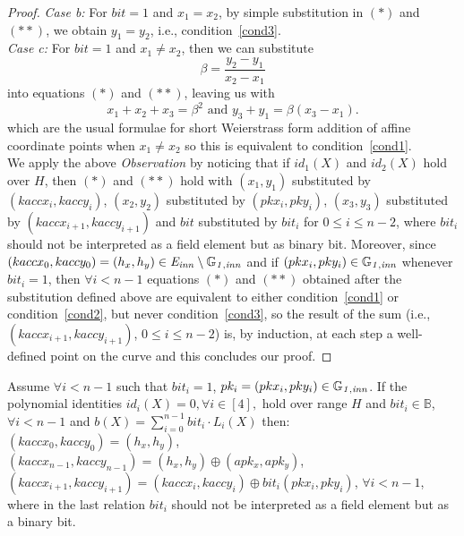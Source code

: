 \begin{proof}
\noindent \textit{Case b:} For $\mathit{bit}=1$ and $x_1=x_2$, by simple substitution in $(\ast)$ and $(\ast \ast)$, 
we obtain $y_1 = y_2$, i.e., condition~\ref{cond3}.  \\

\noindent \textit{Case c:} For $\mathit{bit}=1$ and $x_1 \neq x_2$, then we can substitute
$$\beta=\frac{y_2-y_1}{x_2-x_1}$$ into equations $(\ast)$ and $(\ast \ast)$, leaving us with
$$x_1+x_2+x_3=\beta^2 \textrm{ and } y_3+y_1=\beta(x_3-x_1).$$
which are the usual formulae for short Weierstrass form addition of affine coordinate points when $x_1 \neq x_2$ 
so this is equivalent to condition~\ref{cond1}. \\

\noindent We apply the above \textit{Observation} by noticing that if $id_1(X)$ and $id_2(X)$ hold over $H$, 
then $(\ast)$ and $(\ast \ast)$ hold with $(x_1, y_1)$ substituted by $(kaccx_i,kaccy_i)$, $(x_2, y_2)$ 
substituted by $(pkx_i, pky_i)$, $(x_3, y_3)$ substituted by $(kaccx_{i+1},kaccy_{i+1})$ and $\mathit{bit}$ 
substituted by $\mathit{bit}_i$ for $0 \leq i \leq n-2$, where $\mathit{bit_i}$ should not be interpreted as a field element but as binary 
bit. Moreover, since $(kaccx_{0}, kaccy_{0}) = (h_x, h_y) \in \mathit{E}_{\mathit{inn}} \setminus \mathbb{G}_{\mathit{1,inn}}$ 
and if $(pkx_i, pky_i) \in \mathbb{G}_{\mathit{1,inn}}$ whenever $\mathit{bit}_i = 1$, then $\forall i < n-1$ 
equations $(\ast)$ and $(\ast \ast)$ obtained after the substitution defined above are equivalent to either 
condition~\ref{cond1} or condition~\ref{cond2}, but never condition~\ref{cond3}, so the result of the sum (i.e., $(kaccx_{i+1}, kaccy_{i+1})$, $0\leq i \leq n-2$) is, 
by induction, at each step a well-defined point on the curve and this concludes our proof.
\end{proof}

\begin{corollary} Assume $\forall i < n-1$ 
such that $\mathit{bit}_i = 1$, $pk_i = (pkx_i, pky_i) \in \mathbb{G}_{\mathit{1,inn}}$. 
If the polynomial identities $id_i(X) = 0, \forall i \in [4],$ hold over range $H$ and 
$\mathit{bit_i} \in \mathbb{B}$, $\forall i < n-1$ and $b(X) = \sum_{i=0}^{n-1} \mathit{bit_i} \cdot L_i(X)$
then:  \\
$(kaccx_{0}, kaccy_{0}) = (h_x, h_y)$, \\
$(kaccx_{n-1}, kaccy_{n-1}) = (h_x, h_y) \oplus (apk_x, apk_y)$, \\
$(kaccx_{i+1}, kaccy_{i+1}) =  (kaccx_{i}, kaccy_{i}) \oplus \mathit{bit_i}(pkx_{i}, pky_{i})$, $\forall i < n-1$, where in the last relation 
$\mathit{bit_i}$ should not be interpreted as a field element but as a binary bit.
\label{corollary:keys_affine_comm}
\end{corollary}

